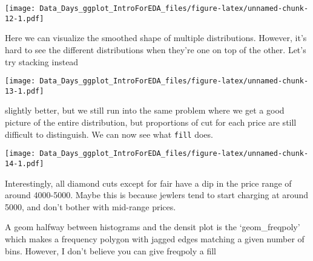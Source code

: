 \documentclass[
]{article}
\newenvironment{Shaded}{\begin{snugshade}}{\end{snugshade}}
\newcommand{\DataTypeTok}[1]{\textcolor[rgb]{0.13,0.29,0.53}{#1}}
\newcommand{\KeywordTok}[1]{\textcolor[rgb]{0.13,0.29,0.53}{\textbf{#1}}}
\newcommand{\NormalTok}[1]{#1}
\newcommand{\OperatorTok}[1]{\textcolor[rgb]{0.81,0.36,0.00}{\textbf{#1}}}
\newcommand{\StringTok}[1]{\textcolor[rgb]{0.31,0.60,0.02}{#1}}
\begin{document}
\texttt{[image: Data\_Days\_ggplot\_IntroForEDA\_files/figure-latex/unnamed-chunk-12-1.pdf]}

Here we can visualize the smoothed shape of multiple distributions.
However, it's hard to see the different distributions when they're one
on top of the other. Let's try stacking instead

\begin{Shaded}
\end{Shaded}

\texttt{[image: Data\_Days\_ggplot\_IntroForEDA\_files/figure-latex/unnamed-chunk-13-1.pdf]}

slightly better, but we still run into the same problem where we get a
good picture of the entire distribution, but proportions of cut for each
price are still difficult to distinguish. We can now see what
\texttt{fill} does.

\begin{Shaded}
\end{Shaded}

\texttt{[image: Data\_Days\_ggplot\_IntroForEDA\_files/figure-latex/unnamed-chunk-14-1.pdf]}

Interestingly, all diamond cuts except for fair have a dip in the price
range of around 4000-5000. Maybe this is because jewlers tend to start
charging at around 5000, and don't bother with mid-range prices.

A geom halfway between histograms and the densit plot is the
`geom\_freqpoly' which makes a frequency polygon with jagged edges
matching a given number of bins. However, I don't believe you can give
freqpoly a fill
\end{document}
